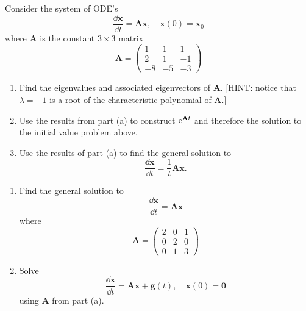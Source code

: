 {\begin{Exercise}
\end{Exercise}











\begin{Exercise}
  \label{exercise dxdt=Ax x0=x0}
  Consider the system of ODE's
  \[
  \frac{\dd \mathbf{x}}{\dd t} = \mathbf{A} \mathbf{x}, \quad
  \mathbf{x}(0) = \mathbf{x}_0
  \]
  where $\mathbf{A}$ is the constant $3 \times 3$ matrix
  \[
  \mathbf{A} = 
  \begin{pmatrix}
    1 & 1 & 1 \\
    2 & 1 & -1 \\
    -8 & -5 & -3 
  \end{pmatrix}
  \]
  \begin{enumerate}
  \item
    Find the eigenvalues and associated eigenvectors of $\mathbf{A}$. [HINT: notice 
    that $\lambda = -1$ is a root of the characteristic polynomial of $\mathbf{A}$.]
  \item
    Use the results from part (a) to construct $\mathop{\mathrm{e}}\nolimits^{\mathbf{A} t}$ and therefore
    the solution to the initial value problem above.
  \item
    Use the results of part (a) to find the general solution to
    \[
    \frac{\dd \mathbf{x}}{\dd t} = \frac{1}{t} \mathbf{A} \mathbf{x}.
    \]
  \end{enumerate}

\end{Exercise}










\begin{Exercise}
  \label{exercise dxdt=Ax}
  \begin{enumerate}
  \item
    Find the general solution to
    \[
    \frac{\dd \mathbf{x}}{\dd t} = \mathbf{A} \mathbf{x}
    \]
    where
    \[
    \mathbf{A} = 
    \begin{pmatrix}
      2 & 0 & 1 \\
      0 & 2 & 0 \\
      0 & 1 & 3
    \end{pmatrix}
    \]
  \item
    Solve
    \[
    \frac{\dd \mathbf{x}}{\dd t} = \mathbf{A} \mathbf{x} + \mathbf{g}(t), \quad \mathbf{x}(0) = \mathbf{0}
    \]
    using $\mathbf{A}$ from part (a).
  \end{enumerate}


\end{Exercise}}
